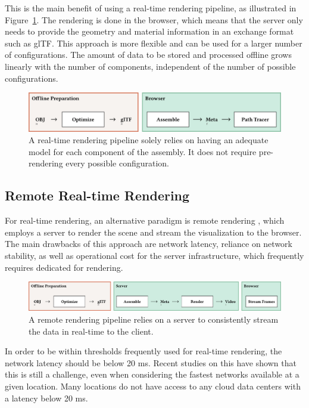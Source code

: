 This is the main benefit of using a real-time rendering pipeline, as illustrated in Figure~\ref{fig:cad-online}. The rendering is done in the browser, which means that the server only needs to provide the geometry and material information in an exchange format such as glTF. This approach is more flexible and can be used for a larger number of configurations. The amount of data to be stored and processed offline grows linearly with the number of components, independent of the number of possible configurations.

\begin{figure}[H]
  \includegraphics[width=\columnwidth]{resources/cad-pipeline-online.png}
  \caption{A real-time rendering pipeline solely relies on having an adequate model for each component of the assembly. It does not require pre-rendering every possible configuration.}
  \label{fig:cad-online}
\end{figure}

\subsection*{Remote Real-time Rendering}

For real-time rendering, an alternative paradigm is remote rendering \cite{remoteRendering}, which employs a server to render the scene and stream the visualization to the browser. The main drawbacks of this approach are network latency, reliance on network stability, as well as operational cost for the server infrastructure, which frequently requires dedicated  for rendering.

\begin{figure}[H]
  \includegraphics[width=\columnwidth]{resources/cad-pipeline-remote.png}
  \caption{A remote rendering pipeline relies on a server to consistently stream the data in real-time to the client.}
  \label{fig:cad-remote}
\end{figure}

In order to be within thresholds frequently used for real-time rendering, the network latency should be below 20 ms. Recent studies on this have shown that this is still a challenge, even when considering the fastest networks available at a given location. Many locations do not have access to any cloud data centers with a latency below 20 ms. \cite{cloudLatency}

